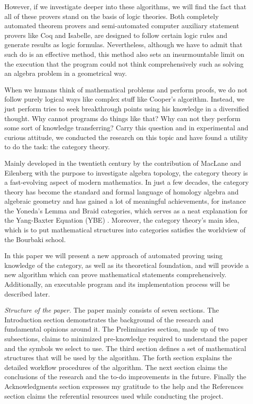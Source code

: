\documentclass{aims}
\numberwithin{equation}{section}
\numberwithin{theorem}{section}	%
\numberwithin{axiom}{section}	%
\numberwithin{definition}{section}	%
\begin{document}
	However, if we investigate deeper into these algorithms, we will find the fact that all of these provers stand on the basis of logic theories. Both completely automated theorem provers and semi-automated computer auxiliary statement provers like Coq and Isabelle, are designed to follow certain logic rules and generate results as logic formulas. Nevertheless, although we have to admit that such do is an effective method, this method also sets an insurmountable limit on the execution that the program could not think comprehensively such as solving an algebra problem in a geometrical way.
	
	When we humans think of mathematical problems and perform proofs, we do not follow purely logical ways like complex stuff like Cooper{'}s algorithm. Instead, we just perform tries to seek breakthrough points using his knowledge in a diversified thought. Why cannot programs do things like that? Why can not they perform some sort of knowledge transferring? Carry this question and in experimental and curious attitude, we conducted the research on this topic and have found a utility to do the task: the category theory.
	
	Mainly developed in the twentieth century by the contribution of MacLane and Eilenberg with the purpose to investigate algebra topology, the category theory is a fast-evolving aspect of modern mathematics. In just a few decades, the category theory has become the standard and formal language of homology algebra and algebraic geometry and has gained a lot of meaningful achievements, for instance the Yoneda{'}s Lemma and Braid categories, which serves as a neat explanation for the Yang-Baxter Equation (YBE) \cite{Li2019}. Moreover, the category theory{'}s main idea, which is to put mathematical structures into categories satisfies the worldview of the Bourbaki school.
	
	In this paper we will present a new approach of automated proving using knowledge of the category, as well as its theoretical foundation, and will provide a new algorithm which can prove mathematical statements comprehensively. Additionally, an executable program and its implementation process will be described later.
	
	\textit{ Structure of the paper.}\newline
	The paper mainly consists of seven sections. The Introduction section demonstrates the background of the research and fundamental opinions around it. The Preliminaries section, made up of two subsections, claims to minimized pre-knowledge required to understand the paper and the symbols we select to use. The third section defines a set of mathematical structures that will be used by the algorithm. The forth section explains the detailed workflow procedures of the algorithm. The next section claims the conclusions of the research and the to-do improvements in the future. Finally the Acknowledgments section expresses my gratitude to the help and the References section claims the referential resources used while conducting the project.
	
\end{document}

